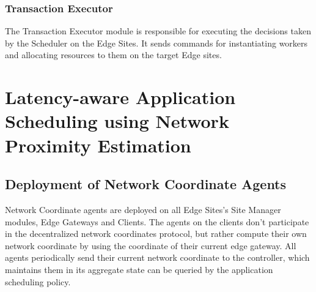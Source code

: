 \subsubsection{Transaction Executor}
The Transaction Executor module is responsible for executing the decisions taken by the Scheduler on the Edge Sites. It sends commands for instantiating workers and allocating resources to them on the target Edge sites.

\section{Latency-aware Application Scheduling using Network Proximity Estimation}
\label{sec:oneedge_nw_prox}
\subsection{Deployment of Network Coordinate Agents}
Network Coordinate agents are deployed on all Edge Sites's Site Manager modules, Edge Gateways and Clients. The agents on the clients don't participate in the decentralized network coordinates protocol, but rather compute their own network coordinate by using the coordinate of their current edge gateway. All agents periodically send their current network coordinate to the controller, which maintains them in its aggregate state can be queried by the application scheduling policy.


